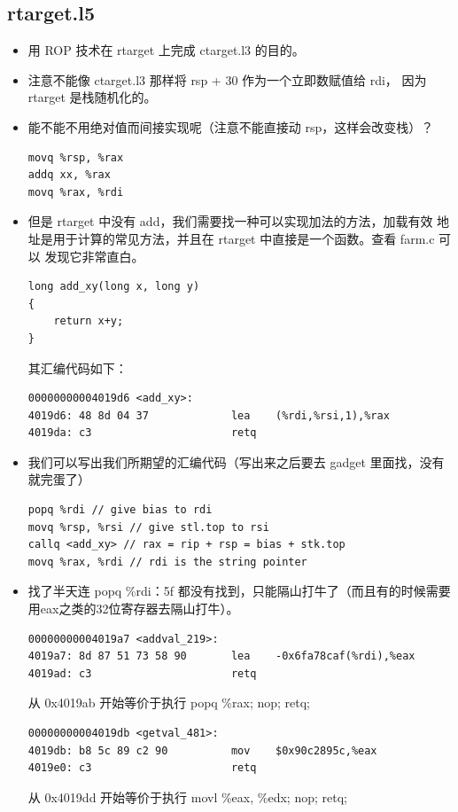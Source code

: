 \documentclass[12pt, a4paper, oneside]{ctexart}
\begin{document}
\subsection{rtarget.l5}
\begin{itemize}
    \item 用 ROP 技术在 rtarget 上完成 ctarget.l3 的目的。
    \item 注意不能像 ctarget.l3 那样将 rsp + 30 作为一个立即数赋值给 rdi，
    因为 rtarget 是栈随机化的。
    \item 能不能不用绝对值而间接实现呢（注意不能直接动 rsp，这样会改变栈）？
\begin{lstlisting}
movq %rsp, %rax
addq xx, %rax
movq %rax, %rdi
\end{lstlisting}
    \item 但是 rtarget 中没有 add，我们需要找一种可以实现加法的方法，加载有效
    地址是用于计算的常见方法，并且在 rtarget 中直接是一个函数。查看 farm.c 可以
    发现它非常直白。
\begin{lstlisting}
long add_xy(long x, long y)
{
    return x+y;
}    
\end{lstlisting}
    其汇编代码如下：
\begin{lstlisting}
00000000004019d6 <add_xy>:
4019d6:	48 8d 04 37          	lea    (%rdi,%rsi,1),%rax
4019da:	c3                   	retq  
\end{lstlisting}
    \item 我们可以写出我们所期望的汇编代码（写出来之后要去 gadget 里面找，没有就完蛋了）
\begin{lstlisting}
popq %rdi // give bias to rdi
movq %rsp, %rsi // give stl.top to rsi
callq <add_xy> // rax = rip + rsp = bias + stk.top
movq %rax, %rdi // rdi is the string pointer
\end{lstlisting}
    \item 找了半天连 popq \%rdi：5f 都没有找到，只能隔山打牛了（而且有的时候需要用eax之类的32位寄存器去隔山打牛）。
\begin{lstlisting}
00000000004019a7 <addval_219>:
4019a7:	8d 87 51 73 58 90    	lea    -0x6fa78caf(%rdi),%eax
4019ad:	c3                   	retq  
\end{lstlisting}
    从 0x4019ab 开始等价于执行 popq \%rax; nop; retq;
\begin{lstlisting}
00000000004019db <getval_481>:
4019db:	b8 5c 89 c2 90       	mov    $0x90c2895c,%eax
4019e0:	c3                   	retq 
\end{lstlisting}
    从 0x4019dd 开始等价于执行 movl \%eax, \%edx; nop; retq;
\begin{lstlisting}

\end{lstlisting}
\end{itemize}
\end{document}
